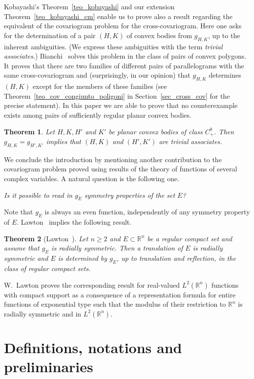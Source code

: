\documentclass[a4paper]{amsart}
\newtheorem{theorem}{Theorem}[section]
\theoremstyle{definition}
\numberwithin{equation}{section}
\begin{document}
Kobayashi's Theorem~\ref{teo_kobayashi} and our extension Theorem~\ref{teo_kobayashi_cm} enable us to prove also a result regarding the equivalent of the covariogram problem for the cross-covariogram. Here one asks for the determination of a pair $(H,K)$ of convex bodies from $g_{H,K}$, up to the inherent ambiguities. (We express these ambiguities with the term \emph{trivial associates}.)
Bianchi~\cite{B4} solves this problem in the class of pairs of convex polygons. It proves that there are two families of different pairs of parallelograms with the same cross-covariogram and (surprisingly, in our opinion) that  $g_{H,K}$ determines $(H,K)$ except for the members of these families (see Theorem~\ref{teo_cov_congiunto_poligoni} in  Section~\ref{sec_cross_cov} for the precise statement).
In this paper we are able to prove that no counterexample exists among pairs of sufficiently regular planar convex bodies.
\begin{theorem}\label{teo_cross_cov_smooth}Let $H, K, H'$ and $K'$ be  planar convex bodies of class $C^8_+$. Then
$g_{H,K}=g_{H',K'}$ implies that $(H,K)$ and $(H',K')$ are trivial associates.
\end{theorem}

We conclude the introduction by mentioning another contribution to the covariogram problem proved using results of the theory of functions of several complex variables.  A natural question is the following one.
\smallskip

\emph{Is it possible to read in $g_E$ symmetry properties of the set $E$?}
\smallskip

Note that $g_E$ is always an even function, independently of any symmetry property of $E$. Lawton~\cite[Corollary~1]{Lawton-1981} implies the following result.
\begin{theorem}[Lawton~\cite{Lawton-1981}]\label{teo_radial_symmetry}
Let $n\geq 2$ and $E\subset{\mathbb{R}}^n$ be a regular compact set and assume that  $g_E$ is radially symmetric. Then a translation of $E$ is radially symmetric and $E$ is determined by $g_E$, up to translation  and reflection, in the class of regular compact sets.
\end{theorem}
W.~Lawton proves the corresponding result for real-valued $L^2({\mathbb{R}}^n)$ functions with compact support as a consequence of a representation formula for entire functions of exponential type such that the modulus of their restriction to ${\mathbb{R}}^n$ is radially symmetric and in $L^2({\mathbb{R}}^n)$.

\section{Definitions, notations and preliminaries}\label{sec_definitions}
\end{document}
